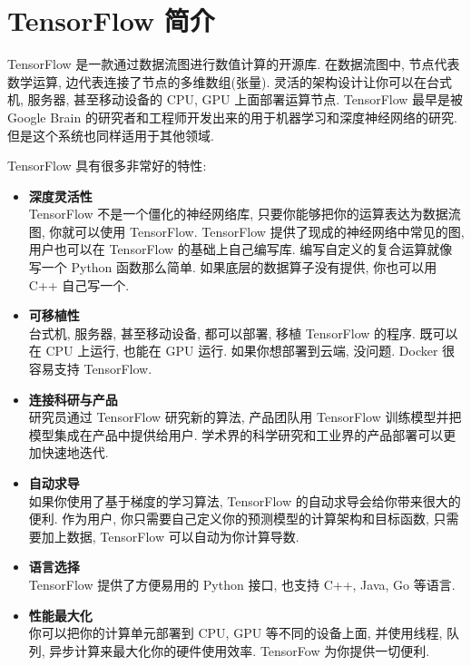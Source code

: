 \section{TensorFlow 简介}

TensorFlow 是一款通过数据流图进行数值计算的开源库. 在数据流图中, 节点代表数学运算, 边代表连接了节点的多维数组(张量). 灵活的架构设计让你可以在台式机, 服务器, 甚至移动设备的 CPU, GPU 上面部署运算节点. TensorFlow 最早是被 Google Brain 的研究者和工程师开发出来的用于机器学习和深度神经网络的研究. 但是这个系统也同样适用于其他领域.

TensorFlow 具有很多非常好的特性\cite{Shuailong2017}:%
%
\begin{itemize}
	\item \textbf{深度灵活性}\\
		TensorFlow 不是一个僵化的神经网络库, 只要你能够把你的运算表达为数据流图, 你就可以使用 TensorFlow. TensorFlow 提供了现成的神经网络中常见的图, 用户也可以在 TensorFlow 的基础上自己编写库. 编写自定义的复合运算就像写一个 Python 函数那么简单. 如果底层的数据算子没有提供, 你也可以用 C++ 自己写一个.
	\item \textbf{可移植性}\\
		台式机, 服务器, 甚至移动设备, 都可以部署, 移植 TensorFlow 的程序. 既可以在 CPU 上运行, 也能在 GPU 运行. 如果你想部署到云端, 没问题. Docker 很容易支持 TensorFlow.
	\item \textbf{连接科研与产品}\\
		研究员通过 TensorFlow 研究新的算法, 产品团队用 TensorFlow 训练模型并把模型集成在产品中提供给用户. 学术界的科学研究和工业界的产品部署可以更加快速地迭代.
	\item \textbf{自动求导}\\
		如果你使用了基于梯度的学习算法, TensorFlow 的自动求导会给你带来很大的便利. 作为用户, 你只需要自己定义你的预测模型的计算架构和目标函数, 只需要加上数据, TensorFlow 可以自动为你计算导数.
	\item \textbf{语言选择}\\
		TensorFlow 提供了方便易用的 Python 接口, 也支持 C++, Java, Go 等语言.
	\item \textbf{性能最大化}\\
		你可以把你的计算单元部署到 CPU, GPU 等不同的设备上面, 并使用线程, 队列, 异步计算来最大化你的硬件使用效率. TensorFow 为你提供一切便利.
\end{itemize}

